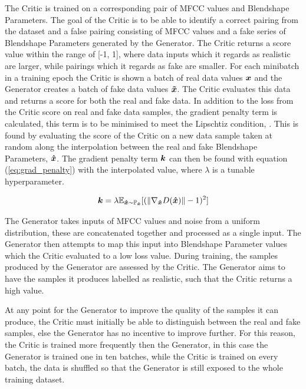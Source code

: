 The Critic is trained on a corresponding pair of MFCC values and Blendshape Parameters.
The goal of the Critic is to be able to identify a correct pairing from the dataset and a false pairing consisting of MFCC values and a fake series of Blendshape Parameters generated by the Generator.
The Critic returns a score value within the range of [-1, 1], where data inputs which it regards as realistic are larger, while pairings which it regards as fake are smaller.
For each minibatch in a training epoch the Critic is shown a batch of real data values ${\boldsymbol{{x}}}$ and the Generator creates a batch of fake data values ${\boldsymbol{{\tilde{x}}}}$.
The Critic evaluates this data and returns a score for both the real and fake data.
In addition to the loss from the Critic score on real and fake data samples, the gradient penalty term is calculated, this term is to be minimised to meet the Lipschtiz condition, \cite{Gulrajani2017}.
This is found by evaluating the score of the Critic on a new data sample taken at random along the interpolation between the real and fake Blendshape Parameters, ${\boldsymbol{{\hat{x}}}}$.
The gradient penalty term ${\boldsymbol{{k}}}$ can then be found with equation (\ref{eq:grad_penalty}) with the interpolated value, where $\lambda$ is a tunable hyperparameter.

\begin{equation}\label{eq:grad_penalty}
    {\boldsymbol{{k}}} = \lambda \mathbb{E}_{{\boldsymbol{{\hat{x}}}} \sim \mathbb{P}_{{\boldsymbol{{\hat{x}}}}}} 
            [(\| \nabla_{{\boldsymbol{{\hat{x}}}}} D({\boldsymbol{{\hat{x}}}}) \| - 1)^2]
\end{equation}

The Generator takes inputs of MFCC values and noise from a uniform distribution, these are concatenated together and processed as a single input.
The Generator then attempts to map this input into Blendshape Parameter values which the Critic evaluated to a low loss value. 
During training, the samples produced by the Generator are assessed by the Critic.
The Generator aims to have the samples it produces labelled as realistic, such that the Critic returns a high value.

At any point for the Generator to improve the quality of the samples it can produce, the Critic must initially be able to distinguish between the real and fake samples, else the Generator has no incentive to improve further.
For this reason, the Critic is trained more frequently then the Generator, in this case the Generator is trained one in ten batches, while the Critic is trained on every batch, the data is shuffled so that the Generator is still exposed to the whole training dataset.

